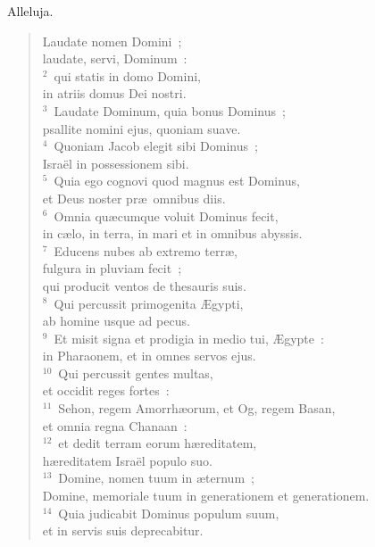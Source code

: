\lettrine[lines=3,image=true,loversize=0.05,lraise=-0.03]{A}{}lleluja. \begin{flushleft}\begin{verse}\vspace{6pt}Laudate nomen Domini~;\\ laudate, servi, Dominum~:\\
${}^{2}$~qui statis in domo Domini,\\ in atriis domus Dei nostri.\\
${}^{3}$~Laudate Dominum, quia bonus Dominus~;\\ psallite nomini ejus, quoniam suave.\\
${}^{4}$~Quoniam Jacob elegit sibi Dominus~;\\ Isra\"el in possessionem sibi.\\
${}^{5}$~Quia ego cognovi quod magnus est Dominus,\\ et Deus noster pr\ae\ omnibus diis.\\
${}^{6}$~Omnia qu\ae cumque voluit Dominus fecit,\\ in c\ae lo, in terra, in mari et in omnibus abyssis.\\
${}^{7}$~Educens nubes ab extremo terr\ae ,\\ fulgura in pluviam fecit~;\\ qui producit ventos de thesauris suis.\\
${}^{8}$~Qui percussit primogenita \AE gypti,\\ ab homine usque ad pecus.\\
${}^{9}$~Et misit signa et prodigia in medio tui, \AE gypte~:\\ in Pharaonem, et in omnes servos ejus.\\
${}^{10}$~Qui percussit gentes multas,\\ et occidit reges fortes~:\\
${}^{11}$~Sehon, regem Amorrh\ae orum, et Og, regem Basan,\\ et omnia regna Chanaan~:\\
${}^{12}$~et dedit terram eorum h\ae reditatem,\\ h\ae reditatem Isra\"el populo suo.\\
${}^{13}$~Domine, nomen tuum in \ae ternum~;\\ Domine, memoriale tuum in generationem et generationem.\\
${}^{14}$~Quia judicabit Dominus populum suum,\\ et in servis suis deprecabitur.\\

\end{verse}
\end{flushleft}
